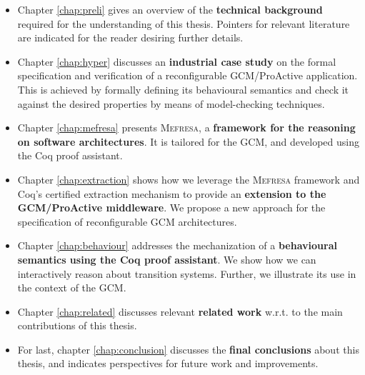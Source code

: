 	\begin{itemize}
		\item Chapter \ref{chap:preli} gives an overview of the \textbf{technical background} required for the understanding 
			      of this thesis. Pointers for relevant literature are indicated for the reader desiring further
				  details.				
				
				  
		\item Chapter \ref{chap:hyper} discusses an \textbf{industrial case study} on the formal specification and verification
			     of a reconfigurable GCM/ProActive application. This is achieved by formally defining its behavioural
				 semantics and check it against the desired properties by means of model-checking techniques. 
			     		
		
		\item Chapter \ref{chap:mefresa} presents \textsc{Mefresa}, a \textbf{framework for the reasoning on software architectures}.
				  It is tailored for the \ac{GCM}, and developed using the Coq proof assistant. 
				  
				  
		\item Chapter \ref{chap:extraction} shows how we leverage the \textsc{Mefresa} framework and Coq's certified extraction 
		         mechanism	to provide an \textbf{extension to the GCM/ProActive middleware}. We propose a 
		         new approach for the specification of reconfigurable \ac{GCM} architectures.		
		
		\item Chapter \ref{chap:behaviour} addresses the mechanization of a \textbf{behavioural semantics using the Coq proof assistant}. We show how we can interactively reason about transition
		systems.
			     Further, we illustrate its use in the context of the \ac{GCM}.
		
		
		\item Chapter \ref{chap:related} discusses relevant \textbf{related work} w.r.t. to the main contributions of this thesis.			
				  	
					

		\item For last, chapter \ref{chap:conclusion} discusses the \textbf{final conclusions} about this thesis, and 
		         indicates perspectives for future work and improvements.
		
		
	\end{itemize}



